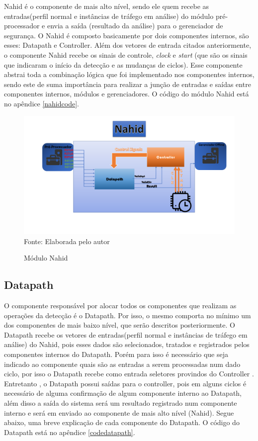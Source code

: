 Nahid é o componente de mais alto nível, sendo ele quem recebe as entradas(perfil normal e instâncias de tráfego em análise) do módulo pré-processador e envia a saída (resultado da análise) para o gerenciador de segurança. O Nahid é composto basicamente por dois componentes  internos, são esses: Datapath e Controller.  Além dos vetores de entrada citados anteriormente, o componente  Nahid recebe os sinais de controle, \textit{clock} e \textit{start} (que são os sinais que indicaram o início da detecção e as mudanças de ciclos). Esse componente  abstrai toda a combinação lógica que foi implementado nos componentes  internos, sendo este de suma importância para realizar a junção de entradas e saídas entre componentes internos, módulos e  gerenciadores. O código do módulo Nahid está no apêndice \ref{nahidcode}.
\begin{figure}[H]
	\label{ops}
	\centering
	\caption{Módulo Nahid}
	\includegraphics[width=12cm]{figures/NahidModule.png}\\
	{Fonte: Elaborada pelo autor}
\end{figure}

\subsection{Datapath}

O componente responsável por alocar todos os componentes que realizam as operações da detecção  é o Datapath. Por isso, o mesmo comporta no mínimo um dos componentes de mais baixo nível, que serão descritos posteriormente. O Datapath recebe os vetores de entradas(perfil normal e instâncias de tráfego em análise) do Nahid, pois esses dados são selecionados, tratados e registrados pelos componentes internos do Datapath. Porém para isso é necessário que seja indicado ao componente quais são as entradas a serem processadas num dado ciclo, por isso o Datapath recebe como entrada seletores provindos do Controller . Entretanto , o Datapath possui saídas para o controller, pois em alguns ciclos é necessário de alguma confirmação de algum componente  interno ao Datapath, além disso a saída do sistema será um resultado registrado num componente interno e será em enviado ao componente de mais alto nível (Nahid). Segue abaixo, uma breve explicação de cada componente do Datapath. O código do Datapath está no apêndice \ref{codedatapath}.


